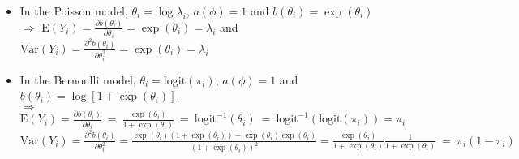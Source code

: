 \documentclass{beamer}
\begin{document}



\begin{frame}

\begin{itemize}
  \item In the Poisson model, $\theta_i = \log\lambda_i$, $a(\phi)=1$ and
    $b(\theta_i)=\exp(\theta_i)$ \\
    \pause \smallskip
    $\Rightarrow$ $\text{E}(Y_i) = \frac{\partial b(\theta_i)}{\partial \theta_i} = \exp(\theta_i) = \lambda_i$
    and $\text{Var}(Y_i) = \frac{\partial^2b(\theta_i)}{\partial \theta_i^2} = \exp(\theta_i) = \lambda_i$
\item In the Bernoulli model, $\theta_{i}  = \text{logit}(\pi_{i})$, $a(\phi) = 1$ and $b(\theta_{i}) = \log[1 + \exp(\theta_{i})] $.  \\
\pause \smallskip
$\Rightarrow$   $\text{E}(Y_i) = \frac{\partial b(\theta_i)}{\partial \theta_i} \ =\ \frac{\exp(\theta_{i})}{1 + \exp(\theta_{i})} \ = \ \text{logit}^{-1}(\theta_{i} )\ = \  \text{logit}^{-1}(\text{logit}(\pi_{i}))  = \pi_{i} $ \\
$\text{Var}(Y_{i}) = \frac{\partial^2b(\theta_i)}{\partial \theta_i^2} = \frac{\exp(\theta_{i})(1 + \exp(\theta_{i}))  - \exp(\theta_{i}) \exp(\theta_{i})}{ (1 + \exp(\theta_{i}))^{2} } = \frac{\exp(\theta_{i})}{1 + \exp(\theta_{i})} \frac{1}{1 + \exp(\theta_{i})}\ = \ \pi_{i} (1- \pi_{i})  $


\end{itemize}



\end{frame}
\end{document}
